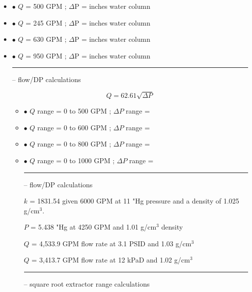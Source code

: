 \begin{itemize}
\item{$\bullet$} $Q$ = 500 GPM ; $\Delta$P =  inches water column
\item{$\bullet$} $Q$ = 245 GPM ; $\Delta$P =  inches water column
\item{$\bullet$} $Q$ = 630 GPM ; $\Delta$P =  inches water column
\item{$\bullet$} $Q$ = 950 GPM ; $\Delta$P =  inches water column
\medskip


\filbreak \vskip 5pt \hrule \vskip 5pt  -- flow/DP calculations \vskip 10pt

$$Q = 62.61 \sqrt{\Delta P}$$

\begin{itemize}
\item{$\bullet$} $Q$ range = 0 to 500 GPM ; $\Delta P$ range = 
\item{$\bullet$} $Q$ range = 0 to 600 GPM ; $\Delta P$ range = 
\item{$\bullet$} $Q$ range = 0 to 800 GPM ; $\Delta P$ range = 
\item{$\bullet$} $Q$ range = 0 to 1000 GPM ; $\Delta P$ range = 
\medskip


\filbreak \vskip 5pt \hrule \vskip 5pt  -- flow/DP calculations \vskip 10pt

$k$ = 1831.54 given 6000 GPM at 11 "Hg pressure and a density of 1.025 g/cm$^{3}$.

\vskip 10pt

$P$ = 5.438 "Hg at 4250 GPM and 1.01 g/cm$^{3}$ density

\vskip 10pt

$Q$ = 4,533.9 GPM flow rate at 3.1 PSID and 1.03 g/cm$^{3}$

\vskip 10pt

$Q$ = 3,413.7 GPM flow rate at 12 kPaD and 1.02 g/cm$^{3}$


\filbreak \vskip 5pt \hrule \vskip 5pt  -- square root extractor range calculations \vskip 10pt



\end{itemize}
\end{itemize}
